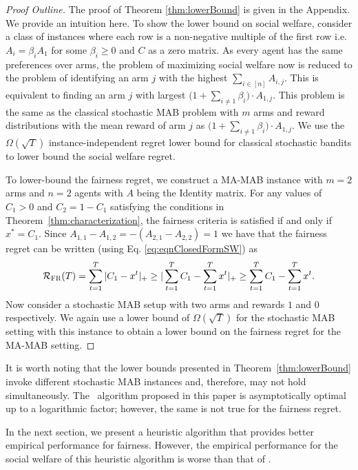 \begin{proof}[Proof Outline]
The proof of Theorem \ref{thm:lowerBound} is given in the Appendix. 
 We provide an intuition here. To show the lower bound on social welfare, consider a class of instances where each row is a non-negative  multiple of the first row i.e. $A_i = \beta_i A_1$ for some $\beta_i \geq 0$ and $C$ as a zero matrix. As every agent has the same preferences over arms, the problem of maximizing social welfare now is reduced to the problem of identifying an arm $j$ with the highest $\sum_{i \in [n]} A_{i,j}$. This is equivalent to finding an arm  $j$ with largest $\Big( 1 +  \sum_{i\neq 1} \beta_i \Big) \cdot A_{1,j}$. This problem is the same as the classical stochastic MAB problem with $m$ arms and reward distributions with the mean reward of arm $j$ as $\Big( 1 +  \sum_{i\neq 1} \beta_i \Big) \cdot A_{1,j}$.   We use the $\Omega(\sqrt{T})$ instance-independent regret  lower bound \cite[Theorem 5.1]{Auer02}  for  classical stochastic  bandits to lower bound the social welfare regret.    

To lower-bound the fairness regret, we construct a MA-MAB instance with $m=2$  arms and $n=2$ agents with $A$ being the Identity matrix. For any values of $C_1 > 0 $  and $ C_2 =1- C_1$ satisfying the conditions in Theorem~\ref{thm:characterization}, the fairness criteria is satisfied if and only if $ x^* = C_1$. Since $ A_{1,1} - A_{1,2} = - (A_{2,1} - A_{2,2}) = 1$ we have that the fairness regret can be written (using Eq. \ref{eq:eqnClosedFormSW}) as 
$$\mathcal{R}_{\textsc{FR}}(T) = \sum_{t=1}^T |C_1 - x^t|_+ \geq | \sum_{t=1}^T  C_1 -  \sum_{t=1}^T x^t|_+ \geq \sum_{t=1}^T  C_1 -  \sum_{t=1}^T x^t. $$  Now consider a stochastic MAB setup with two arms and rewards $1 $  and $0$ respectively. We again use a lower bound of $\Omega(\sqrt{T})$ for the stochastic MAB setting with this instance to obtain a lower bound on the fairness regret for the MA-MAB setting.     
\end{proof}

It is worth noting that the lower bounds presented in Theorem~\ref{thm:lowerBound} invoke different stochastic MAB instances and, therefore, may not hold simultaneously. The \ouralgo\ algorithm proposed in this paper is asymptotically optimal up to a logarithmic factor; however, the same is not true for the fairness regret.   

In the next section, we present a heuristic algorithm that provides better empirical performance for fairness. However, the empirical performance for the social welfare of this heuristic algorithm is worse than that of \ouralgo.   

